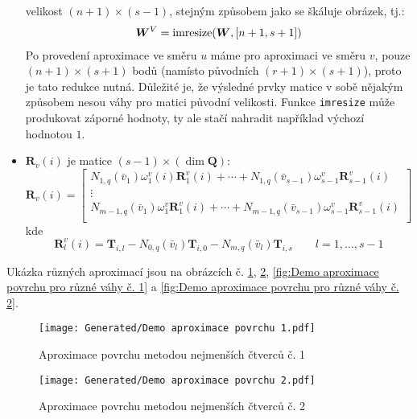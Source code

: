 \begin{itemize}
          velikost $(n+1) \times (s-1)$, stejným způsobem jako se škáluje obrázek, tj.:
          \begin{align}
              \bm{W}^V = \operatorname{imresize}(\bm{W}, [n + 1, s + 1])
          \end{align}
          Po provedení aproximace ve směru $u$ máme pro aproximaci ve směru $v$,
          pouze $(n+1)\times(s+1)$ bodů (namísto původních $(r+1)\times(s+1)$),
          proto je tato redukce nutná.
          Důležité je, že výsledné prvky matice v sobě nějakým způsobem nesou
          váhy pro matici původní velikosti.
          Funkce \texttt{imresize} může produkovat záporné hodnoty,
          ty ale stačí nahradit například výchozí hodnotou $1$.
    \item $\bm{R}_v(i)$ je matice $(s - 1) \times(\dim\bm{Q})$:
          \begin{equation}
              \bm{R}_v(i) =
              \begin{bmatrix}
                  N_{1,q}(\bar{v}_1)\omega^v_1(i)\bm{R}^v_1(i) + \cdots + N_{1, q}(\bar{v}_{s - 1})\omega^v_{s-1}\bm{R}^v_{s - 1}(i) \\
                  \vdots                                                                                                             \\
                  N_{m-1,q}(\bar{v}_1)\omega^v_1\bm{R}^v_1(i) + \cdots + N_{m-1, q}(\bar{v}_{s - 1})\omega^v_{s-1}\bm{R}^v_{s- 1}(i) \\
              \end{bmatrix}
          \end{equation}
          kde
          \begin{equation}
              \bm{R}^v_l(i)  = \bm{T}_{i,l} - N_{0, q}(\bar{v}_l)\bm{T}_{i,0} - N_{m,q}(\bar{v}_l)\bm{T}_{i, s} \quad\quad l = 1, \ldots, s -1
          \end{equation}
\end{itemize}
Ukázka různých aproximací jsou na obrázcích č. \ref{fig:Demo aproximace povrchu č. 1},
\ref{fig:Demo aproximace povrchu č. 2},
\ref{fig:Demo aproximace povrchu pro různé váhy č. 1} a
\ref{fig:Demo aproximace povrchu pro různé váhy č. 2}.

\begin{imagepage}
    \begin{figure}[H]
        \centering
        \texttt{[image: Generated/Demo aproximace povrchu 1.pdf]}
        \caption{Aproximace povrchu metodou nejmenších čtverců č. 1}
        \label{fig:Demo aproximace povrchu č. 1}
    \end{figure}
    \begin{figure}[H]
        \centering
        \texttt{[image: Generated/Demo aproximace povrchu 2.pdf]}
        \caption{Aproximace povrchu metodou nejmenších čtverců č. 2}
        \label{fig:Demo aproximace povrchu č. 2}
    \end{figure}
\end{imagepage}

